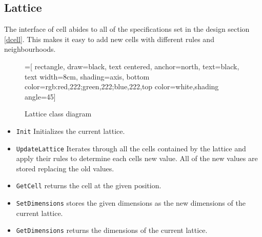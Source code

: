 \documentclass[a4paper, 10pt]{article}
\begin{document}
\subsection{Lattice}
\label{ilattice}
The interface of cell abides to all of the specifications set in the design section \ref{dcell}. This makes it easy to add new cells with different rules and neighbourhoods.
\begin{figure}[!ht]
\center
{}=[
    rectangle,
    draw=black,
    text centered,
    anchor=north,
    text=black,
    text width=8cm,
    shading=axis,
    bottom color={rgb:red,222;green,222;blue,222},top color=white,shading angle=45]

\caption{Lattice class diagram}
\end{figure}
\begin{itemize}
\item \texttt{Init} Initializes the current lattice.
\item \texttt{UpdateLattice} Iterates through all the cells contained by the lattice and apply their rules to determine each cells new value. All of the new values are stored replacing the old values.
\item \texttt{GetCell} returns the cell at the given position.
\item \texttt{SetDimensions} stores the given dimensions as the new dimensions of the current lattice.
\item \texttt{GetDimensions} returns the dimensions of the current lattice.
\end{itemize}
\end{document}

